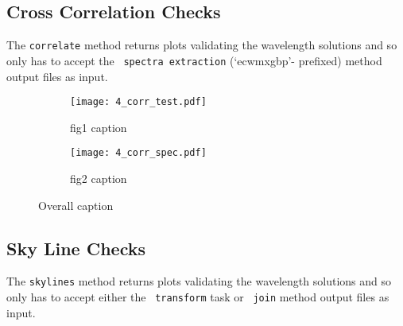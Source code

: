 
\subsection{Cross Correlation Checks} \label{subsec:test_corr}

The \texttt{correlate} method returns plots validating the wavelength solutions and so only has to accept the \polsalt\ \texttt{spectra extraction} (`ecwmxgbp'- prefixed) method output files as input.

\begin{figure}
    \centering
    \begin{subfigure}[b]{\textwidth}
        \centering
        \texttt{[image: 4\_corr\_test.pdf]}
        \caption{fig1 caption}
        \label{subfig:fig1_label}
    \end{subfigure}
    \hfill
    \begin{subfigure}[b]{\textwidth}
        \centering
        \texttt{[image: 4\_corr\_spec.pdf]}
        \caption{fig2 caption}
        \label{subfig:fig2_label}
    \end{subfigure}
    \caption{Overall caption}
    \label{fig:fig_caption}
\end{figure}



\subsection{Sky Line Checks} \label{subsec:test_sky}

The \texttt{skylines} method returns plots validating the wavelength solutions and so only has to accept either the \iraf\ \texttt{transform} task or \stops\ \texttt{join} method output files as input.



